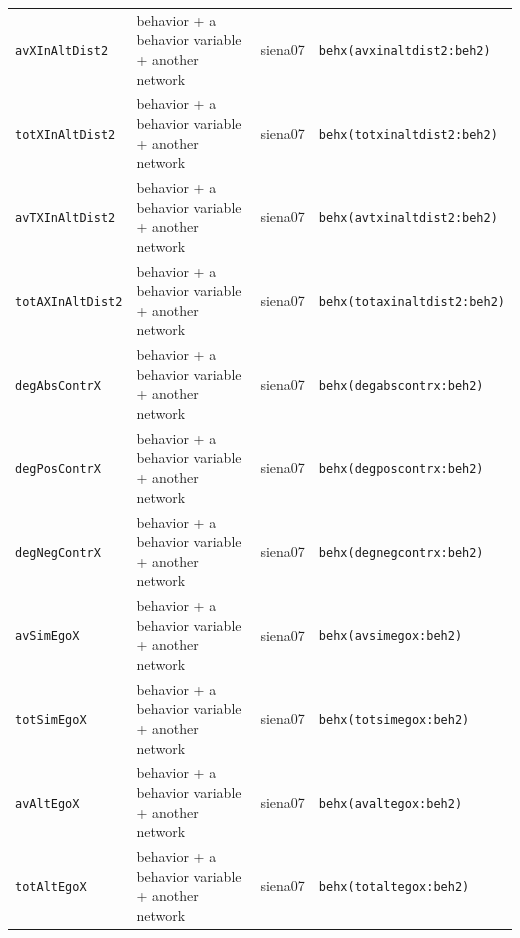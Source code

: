 \begin{longtable}{@{}p{2.6cm}p{3.2cm}p{2.9cm}p{5.4cm}@{}}
\texttt{avXInAltDist2} & behavior + a behavior variable + another network & siena07 & \texttt{behx(avxinaltdist2:beh2)}\\
\texttt{totXInAltDist2} & behavior + a behavior variable + another network & siena07 & \texttt{behx(totxinaltdist2:beh2)}\\
\texttt{avTXInAltDist2} & behavior + a behavior variable + another network & siena07 & \texttt{behx(avtxinaltdist2:beh2)}\\
\texttt{totAXInAltDist2} & behavior + a behavior variable + another network & siena07 & \texttt{behx(totaxinaltdist2:beh2)}\\
\texttt{degAbsContrX} & behavior + a behavior variable + another network & siena07 & \texttt{behx(degabscontrx:beh2)}\\
\texttt{degPosContrX} & behavior + a behavior variable + another network & siena07 & \texttt{behx(degposcontrx:beh2)}\\
\texttt{degNegContrX} & behavior + a behavior variable + another network & siena07 & \texttt{behx(degnegcontrx:beh2)}\\
\texttt{avSimEgoX} & behavior + a behavior variable + another network & siena07 & \texttt{behx(avsimegox:beh2)}\\
\texttt{totSimEgoX} & behavior + a behavior variable + another network & siena07 & \texttt{behx(totsimegox:beh2)}\\
\texttt{avAltEgoX} & behavior + a behavior variable + another network & siena07 & \texttt{behx(avaltegox:beh2)}\\
\texttt{totAltEgoX} & behavior + a behavior variable + another network & siena07 & \texttt{behx(totaltegox:beh2)}\\
\bottomrule
\end{longtable}
\normalsize

